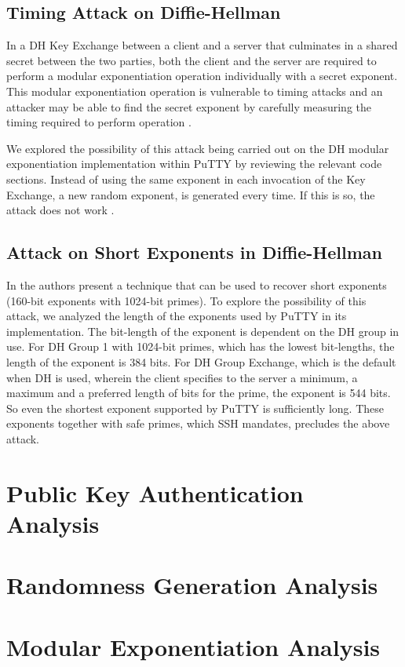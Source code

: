 \documentclass{report}
\begin{document}
\section{Timing Attack on Diffie-Hellman}
In a DH Key Exchange between a client and a server that culminates in a shared secret between the two parties, both the client and the server are required to perform a modular exponentiation operation individually with a secret exponent. This modular exponentiation operation is vulnerable to timing attacks and an attacker may be able to find the secret exponent by carefully measuring the timing required to perform operation \cite{kocher96}.\par
We explored the possibility of this attack being carried out on the DH modular exponentiation implementation within PuTTY by reviewing the relevant code sections. Instead of using the same exponent in each invocation of the Key Exchange, a new random exponent, is generated every time. If this is so, the attack does not work \cite{kocher96}.\par
\section{Attack on Short Exponents in Diffie-Hellman}
In \cite{oorschot96} the authors present a technique that can be used to recover short exponents (160-bit exponents with 1024-bit primes). To explore the possibility of this attack, we analyzed the length of the exponents used by PuTTY in its implementation. The bit-length of the exponent is dependent on the DH group in use. For DH Group 1 with 1024-bit primes, which has the lowest bit-lengths, the length of the exponent is 384 bits. For DH Group Exchange, which is the default when DH is used, wherein the client specifies to the server a minimum, a maximum and a preferred length of bits for the prime, the exponent is 544 bits. So even the shortest exponent supported by PuTTY is sufficiently long. These exponents together with safe primes, which SSH mandates, precludes the above attack.
\chapter{Public Key Authentication Analysis}
\chapter{Randomness Generation Analysis}
\chapter{Modular Exponentiation Analysis}
\end{document}
